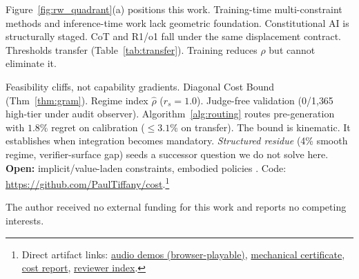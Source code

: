 \documentclass{article}
\theoremstyle{plain}
\theoremstyle{definition}
\theoremstyle{remark}
\newcommand{\rhohat}{\hat{\rho}}
\begin{document}


Figure~\ref{fig:rw_quadrant}(a) positions this work. Training-time multi-constraint methods \citep{yu2020gradient,liu2021cagrad,navon2022nashmtl,he2025pama,sener2018multi} and inference-time work \citep{madaan2023selfrefine,meyerson2025maker,lior2025wildifeval,qi2025agentif} lack geometric foundation. Constitutional AI \citep{bai2022constitutional} is structurally staged. CoT and R1/o1 fall under the same displacement contract. Thresholds transfer (Table~\ref{tab:transfer}). Training reduces $\rho$ but cannot eliminate it.

Feasibility cliffs, not capability gradients. Diagonal Cost Bound (Thm~\ref{thm:gram}). Regime index $\rhohat$ ($r_s{=}1.0$). Judge-free validation (0/1{,}365 high-tier under audit observer). Algorithm~\ref{alg:routing} routes pre-generation with $1.8\%$ regret on calibration ($\le 3.1\%$ on transfer). The bound is kinematic. It establishes when integration becomes mandatory. \emph{Structured residue} (4\% smooth regime, verifier-surface gap) seeds a successor question we do not solve here. \textbf{Open:} implicit/value-laden constraints, embodied policies \citep{nvidia2025cosmos}. Code: \url{https://github.com/PaulTiffany/cost}.\footnote{Direct artifact links: \href{https://PaulTiffany.github.io/cost/supplementary/demos/audio_demos/INDEX.html}{audio demos (browser-playable)}, \href{https://github.com/PaulTiffany/cost/blob/master/ci/claim_certificate.md}{mechanical certificate}, \href{https://github.com/PaulTiffany/cost/blob/master/ci/cost_report.json}{cost report}, \href{https://github.com/PaulTiffany/cost/blob/master/supplementary/REVIEWER_INDEX.md}{reviewer index}.}

\begin{ack}
The author received no external funding for this work and reports no competing interests.
\end{ack}


{\raggedright


}


\appendix
\end{document}

